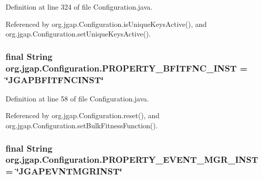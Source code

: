Definition at line 324 of file Configuration.\-java.



Referenced by org.\-jgap.\-Configuration.\-is\-Unique\-Keys\-Active(), and org.\-jgap.\-Configuration.\-set\-Unique\-Keys\-Active().

\hypertarget{classorg_1_1jgap_1_1_configuration_aab06d33367ed969b4a4909db328f7c1c}{
\subsubsection[{P\-R\-O\-P\-E\-R\-T\-Y\-\_\-\-B\-F\-I\-T\-F\-N\-C\-\_\-\-I\-N\-S\-T}]{\setlength{\rightskip}{0pt plus 5cm}final String org.\-jgap.\-Configuration.\-P\-R\-O\-P\-E\-R\-T\-Y\-\_\-\-B\-F\-I\-T\-F\-N\-C\-\_\-\-I\-N\-S\-T = \char`\"{}J\-G\-A\-P\-B\-F\-I\-T\-F\-N\-C\-I\-N\-S\-T\char`\"{}\hspace{0.3cm}{\ttfamily [static]}}}\label{classorg_1_1jgap_1_1_configuration_aab06d33367ed969b4a4909db328f7c1c}


Definition at line 58 of file Configuration.\-java.



Referenced by org.\-jgap.\-Configuration.\-reset(), and org.\-jgap.\-Configuration.\-set\-Bulk\-Fitness\-Function().

\hypertarget{classorg_1_1jgap_1_1_configuration_a2fd1d2a740982e62f54747bfde9d6701}{
\subsubsection[{P\-R\-O\-P\-E\-R\-T\-Y\-\_\-\-E\-V\-E\-N\-T\-\_\-\-M\-G\-R\-\_\-\-I\-N\-S\-T}]{\setlength{\rightskip}{0pt plus 5cm}final String org.\-jgap.\-Configuration.\-P\-R\-O\-P\-E\-R\-T\-Y\-\_\-\-E\-V\-E\-N\-T\-\_\-\-M\-G\-R\-\_\-\-I\-N\-S\-T = \char`\"{}J\-G\-A\-P\-E\-V\-N\-T\-M\-G\-R\-I\-N\-S\-T\char`\"{}\hspace{0.3cm}{\ttfamily [static]}}}\label{classorg_1_1jgap_1_1_configuration_a2fd1d2a740982e62f54747bfde9d6701}


